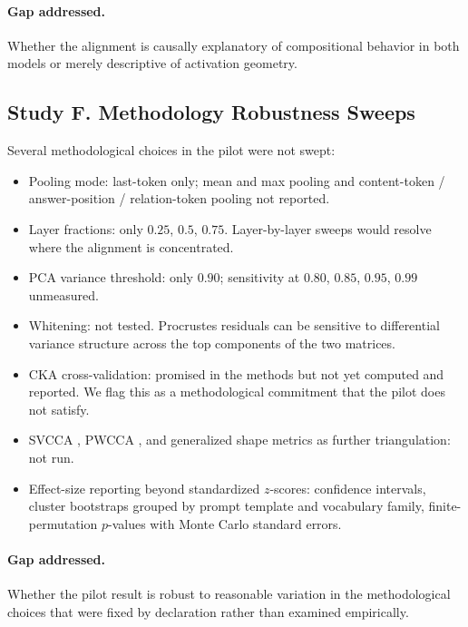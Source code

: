 \paragraph{Gap addressed.} Whether the alignment is causally
explanatory of compositional behavior in both models or merely
descriptive of activation geometry.

\subsection{Study F. Methodology Robustness Sweeps}

Several methodological choices in the pilot were not swept:

\begin{itemize}
    \item Pooling mode: last-token only; mean and max pooling and
        content-token / answer-position / relation-token pooling not
        reported.
    \item Layer fractions: only $0.25$, $0.5$, $0.75$. Layer-by-layer
        sweeps would resolve where the alignment is concentrated.
    \item PCA variance threshold: only $0.90$; sensitivity at $0.80$,
        $0.85$, $0.95$, $0.99$ unmeasured.
    \item Whitening: not tested. Procrustes residuals can be sensitive
        to differential variance structure across the top components
        of the two matrices.
    \item CKA \cite{kornblith2019similarity} cross-validation:
        promised in the methods but not yet computed and reported. We
        flag this as a methodological commitment that the pilot does
        not satisfy.
    \item SVCCA \cite{raghu2017svcca}, PWCCA \cite{morcos2018insights},
        and generalized shape metrics \cite{williams2021generalized}
        as further triangulation: not run.
    \item Effect-size reporting beyond standardized $z$-scores:
        confidence intervals, cluster bootstraps grouped by prompt
        template and vocabulary family, finite-permutation $p$-values
        with Monte Carlo standard errors.
\end{itemize}

\paragraph{Gap addressed.} Whether the pilot result is robust to
reasonable variation in the methodological choices that were fixed by
declaration rather than examined empirically.

